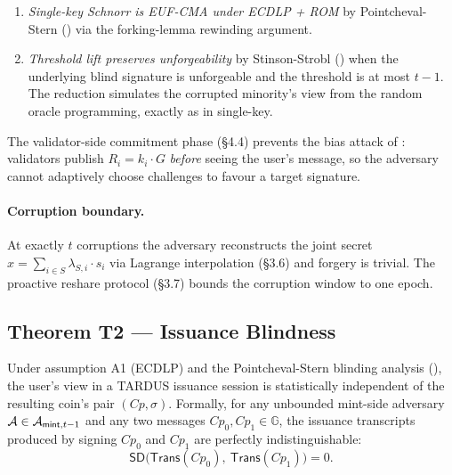 \begin{enumerate}[leftmargin=2em,itemsep=0pt]
  \item \emph{Single-key Schnorr is EUF-CMA under ECDLP + ROM} by
        Pointcheval-Stern (\cite{pointcheval-stern1996}) via the
        forking-lemma rewinding argument.
  \item \emph{Threshold lift preserves unforgeability} by Stinson-Strobl
        (\cite{stinson-strobl2001}) when the underlying blind signature is
        unforgeable and the threshold is at most $t-1$. The reduction
        simulates the corrupted minority's view from the random
        oracle programming, exactly as in single-key.
\end{enumerate}

The validator-side commitment phase
(\S4.4) prevents the bias attack of
\cite{nick-ruffing-seurin2020}: validators publish $R_i = k_i \cdot G$
\emph{before} seeing the user's message, so the adversary cannot adaptively
choose challenges to favour a target signature.

\paragraph{Corruption boundary.} At exactly $t$ corruptions the adversary
reconstructs the joint secret $x = \sum_{i \in S} \lambda_{S,i} \cdot s_i$
via Lagrange interpolation (\S3.6) and forgery is trivial.
The proactive reshare protocol (\S3.7) bounds the corruption
window to one epoch.

\subsection{Theorem T2 --- Issuance Blindness}
\label{sec:thm-blindness}

\begin{theorem}
\label{thm:issuance-blindness}
Under assumption A1 (ECDLP) and the Pointcheval-Stern blinding analysis
(\cite{pointcheval-stern1996}), the user's view in a TARDUS issuance
session is statistically independent of the resulting coin's pair
$(Cp, \sigma)$. Formally, for any unbounded mint-side adversary
$\mathcal{A} \in \mathcal{A}_{\mathsf{mint},t-1}$ and any two messages
$Cp_0, Cp_1 \in \mathbb{G}$, the issuance transcripts produced by signing
$Cp_0$ and $Cp_1$ are perfectly indistinguishable:
\[
  \mathsf{SD}\bigl(\mathsf{Trans}(Cp_0),\ \mathsf{Trans}(Cp_1)\bigr) = 0.
\]
\end{theorem}

